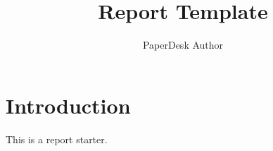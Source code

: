 \documentclass{report}
\title{Report Template}
\author{PaperDesk Author}
\begin{document}
\maketitle
\chapter{Introduction}
This is a report starter.
\end{document}
